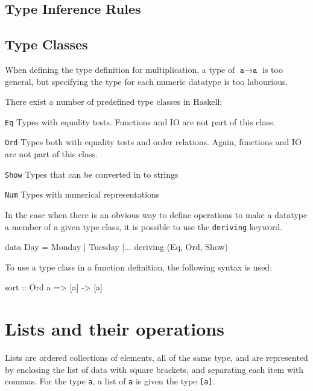 \documentclass[10pt]{article}
\begin{document}
\subsection{Type Inference Rules}
\subsection{Type Classes}
When defining the type definition for multiplication, a type of $\texttt{a} \rightarrow \texttt{a}$ is too general, but specifying the type for each numeric datatype is too labourious.

There exist a number of predefined type classes in Haskell:
\begin{description*}
	\item[\texttt{Eq}]Types with equality tests.  Functions and IO are not part of this class.
	\item[\texttt{Ord}]Types both with equality tests and order relations.  Again, functions and IO are not part of this class.
	\item[\texttt{Show}]Types that can be converted in to strings
	\item[\texttt{Num}]Types with numerical representations
\end{description*}
In the case when there is an obvious way to define operations to make a datatype a member of a given type class, it is possible to use the \texttt{deriving} keyword.
\begin{code}
data Day = Monday | Tuesday |... deriving (Eq, Ord, Show)
\end{code}
To use a type class in a function definition, the following syntax is used:
\begin{code}
sort :: Ord a => [a] -> [a]
\end{code}
\section{Lists and their operations}
Lists are ordered collections of elements, all of the same type, and are represented by enclosing the list of data with square brackets, and separating each item with commas.  For the type \texttt{a}, a list of \texttt{a} is given the type \texttt{[a]}.
\end{document}

